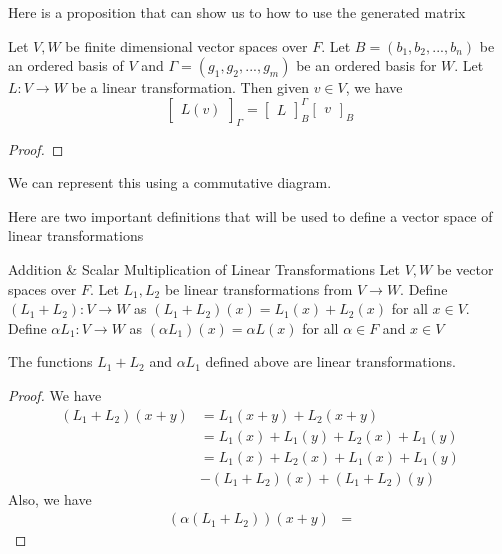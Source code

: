 \documentclass[main.tex]{subfiles}
\begin{document}
    Here is a proposition that can show us to how to use the generated matrix 
    \begin{prop}{}{}
        Let $V,W$ be finite dimensional vector spaces over $F$. Let $B = (b_1, b_2, ..., b_n)$ be an ordered basis of $V$ and $\Gamma = (g_1, g_2, ..., g_m)$ be an ordered basis for $W$. Let $L:V\to W$ be a linear transformation. Then given $v\in V$, we have 
        \begin{equation}
            \begin{bmatrix} L(v) \end{bmatrix}_\Gamma = \begin{bmatrix} L \end{bmatrix}_B^\Gamma \begin{bmatrix} v \end{bmatrix}_B
        \end{equation}
    \end{prop}
    \begin{proof}
        
    \end{proof}
    We can represent this using a commutative diagram. 
    \begin{figure}[H]
        \centering
    \end{figure}

    Here are two important definitions that will be used to define a vector space of linear transformations
    \begin{defn}{Addition \& Scalar Multiplication of Linear Transformations}{}
        Let $V,W$ be vector spaces over $F$. Let $L_1, L_2$ be linear transformations from $V\to W$. Define $(L_1 + L_2) : V\to W$ as $(L_1 + L_2)(x) = L_1(x) + L_2(x)$ for all $x\in V$. Define $\alpha L_1: V\to W$ as $(\alpha L_1)(x) = \alpha L(x)$ for all $\alpha \in F$ and $x\in V$
    \end{defn}

    \begin{prop}{}{}
        The functions $L_1 + L_2$ and $\alpha L_1$ defined above are linear transformations.
    \end{prop}
    \begin{proof}
        We have 
        \begin{align*}
            (L_1 + L_2)(x + y) &= L_1(x + y) + L_2(x + y) \\
            &= L_1(x) + L_1(y) + L_2(x) + L_1(y) \\
            &= L_1(x) + L_2(x) + L_1(x) + L_1(y) \\
            &- (L_1 + L_2)(x) + (L_1 + L_2)(y)
        \end{align*}
        Also, we have 
        \begin{align*}
            (\alpha(L_1 + L_2))(x + y) &= 
        \end{align*}
    \end{proof}
\end{document}
